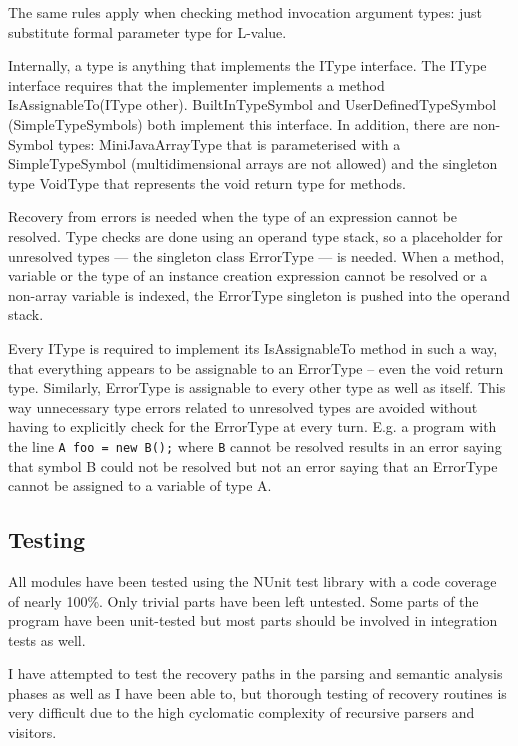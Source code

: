 \documentclass[a4paper,11pt]{article}
\begin{document}
The same rules apply when checking method invocation argument types: just substitute formal parameter type for L-value.

Internally, a type is anything that implements the IType interface. The IType interface requires that the implementer implements a method IsAssignableTo(IType other). BuiltInTypeSymbol and UserDefinedTypeSymbol (SimpleTypeSymbols) both implement this interface. In addition, there are non-Symbol types: MiniJavaArrayType that is parameterised with a SimpleTypeSymbol (multidimensional arrays are not allowed) and the singleton type VoidType that represents the void return type for methods.

Recovery from errors is needed when the type of an expression cannot be resolved. Type checks are done using an operand type stack, so a placeholder for unresolved types --- the singleton class ErrorType --- is needed. When a method, variable or the type of an instance creation expression cannot be resolved or a non-array variable is indexed, the ErrorType singleton is pushed into the operand stack.

Every IType is required to implement its IsAssignableTo method in such a way, that everything appears to be assignable to an ErrorType -- even the void return type. Similarly, ErrorType is assignable to every other type as well as itself. This way unnecessary type errors related to unresolved types are avoided without having to explicitly check for the ErrorType at every turn. E.g. a program with the line \verb,A foo = new B();, where \verb,B, cannot be resolved results in an error saying that symbol B could not be resolved but not an error saying that an ErrorType cannot be assigned to a variable of type A.

\subsection{Testing}

All modules have been tested using the NUnit test library with a code coverage of nearly 100\%. Only trivial parts have been left untested. Some parts of the program have been unit-tested but most parts should be involved in integration tests as well.

I have attempted to test the recovery paths in the parsing and semantic analysis phases as well as I have been able to, but thorough testing of recovery routines is very difficult due to the high cyclomatic complexity of recursive parsers and visitors.
\end{document}
